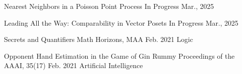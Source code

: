 


\begin{cventries}




\cventrylightpub
  {Nearest Neighbors in a Poisson Point Process}
  {In Progress}
  {Mar., 2025}
  {}

\cventrylightpub
  {Leading All the Way: Comparability in Vector Posets}
  {In Progress}
  {Mar., 2025}
  {}

\cventrylightpub
  {Secrets and Quantifiers}
  {Math Horizons, MAA}
  {Feb. 2021}
  {Logic}


\cventrylightpub
  {Opponent Hand Estimation in the Game of Gin Rummy}
  {Proceedings of the AAAI, 35(17)}
  {Feb. 2021}
  {Artificial Intelligence}


  





\end{cventries}